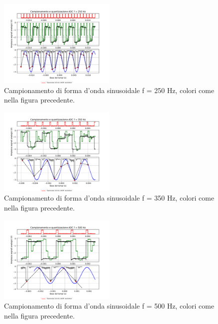 \documentclass[journal]{IEEEtran}
\begin{document}
\begin{figure}[H]%
\begin{center}
\includegraphics[trim={0 25 0 0}, clip,width=0.50\textwidth]{analysis/output/campionamento_250Hz.pdf}
\caption{Campionamento di forma d'onda sinusoidale f = 250 Hz, colori come nella figura precedente.}
\label{fig:sampSH3}
\end{center}
\end{figure}
\vspace{-10mm}
%
\begin{figure}[H]%
\begin{center}
\includegraphics[trim={0 40 0 0}, clip,width=0.50\textwidth]{analysis/output/campionamento_350Hz.pdf}
\caption{Campionamento di forma d'onda sinusoidale f = 350 Hz, colori come nella figura precedente.}
\label{fig:sampSH4}
\end{center}
\end{figure}
\vspace{-10mm}
%
\begin{figure}[H]%
\begin{center}
\includegraphics[trim={0 40 0 0}, clip,width=0.50\textwidth]{analysis/output/campionamento_500Hz.pdf}
\caption{Campionamento di forma d'onda sinusoidale f = 500 Hz, colori come nella figura precedente.}
\label{fig:sampSH5}
\end{center}
\end{figure}
\end{document}
